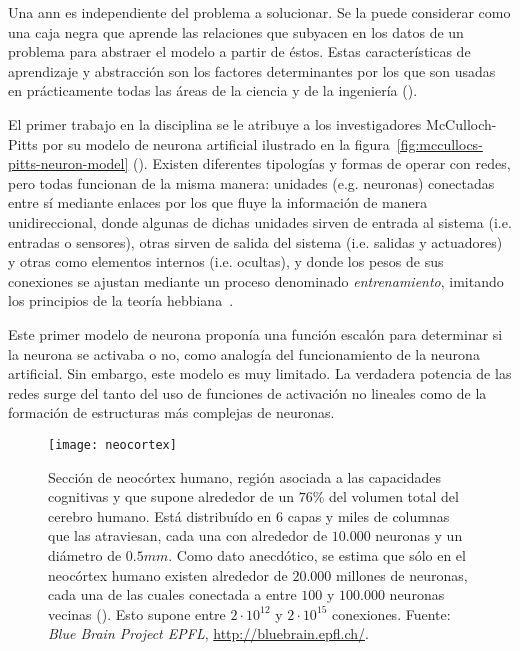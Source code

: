 Una \Acrfull{ann} es independiente del problema a solucionar. Se la puede considerar como una caja negra que aprende las relaciones que subyacen en los datos de un problema para abstraer el modelo a partir de éstos. Estas características de aprendizaje y abstracción son los factores determinantes por los que son usadas en prácticamente todas las áreas de la ciencia y de la ingeniería (\cite{Du2006}).

El primer trabajo en la disciplina se le atribuye a  los investigadores McCulloch-Pitts por su modelo de neurona artificial ilustrado en la figura~\ref{fig:mccullocs-pitts-neuron-model} (\cite{McCulloch1943}). Existen diferentes tipologías y formas de operar con redes, pero todas funcionan de la misma manera: unidades (e.g. neuronas) conectadas entre sí mediante enlaces por los que fluye la información de manera unidireccional, donde algunas de dichas unidades sirven de entrada al sistema (i.e. entradas o sensores), otras sirven de salida del sistema (i.e. salidas y actuadores) y otras como elementos internos (i.e. ocultas), y donde los pesos de sus conexiones se ajustan mediante un proceso denominado \textit{entrenamiento}, imitando los principios de la teoría hebbiana~\cite{hebb19680}.

Este primer modelo de neurona proponía una función escalón para determinar si la neurona se activaba o no, como analogía del funcionamiento de la neurona artificial. Sin embargo, este modelo es muy limitado. La verdadera potencia de las redes surge del tanto del uso de funciones de activación no lineales como de la formación de estructuras más complejas de neuronas.

\begin{figure}[t]
	\centering
	\texttt{[image: neocortex]}
	\caption[Sección de neocórtex humano]{Sección de neocórtex humano, región asociada a las capacidades cognitivas y que supone alrededor de un $76\%$ del volumen total del cerebro humano. Está distribuído en $6$ capas y miles de columnas que las atraviesan, cada una con alrededor de $10.000$ neuronas y un diámetro de $0.5mm$.  Como dato anecdótico, se estima que sólo en el neocórtex humano existen alrededor de $20.000$ millones de neuronas, cada una de las cuales conectada a entre $100$ y $100.000$ neuronas vecinas (\cite{Pakkenberg1997}). Esto supone entre $2 \cdot 10^{12}$ y $2 \cdot 10^{15}$ conexiones. Fuente: \textit{Blue Brain Project EPFL}, \url{http://bluebrain.epfl.ch/}.}
	\label{fig:neocortex}
\end{figure}

